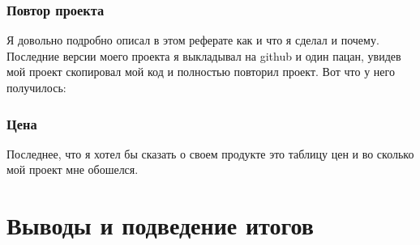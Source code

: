 \documentclass[a4paper, 12pt]{article}
\begin{document}
\newpage

\subsubsection{Повтор проекта}

Я довольно подробно описал в этом реферате как и что я сделал и почему. 
Последние версии моего проекта я выкладывал на github и один пацан, увидев мой
проект скопировал мой код и полностью повторил проект. Вот что у него 
получилось:


\subsubsection{Цена}

Последнее, что я хотел бы сказать о своем продукте это таблицу цен и во сколько
мой проект мне обошелся.


\section{Выводы и подведение итогов}
\end{document}

